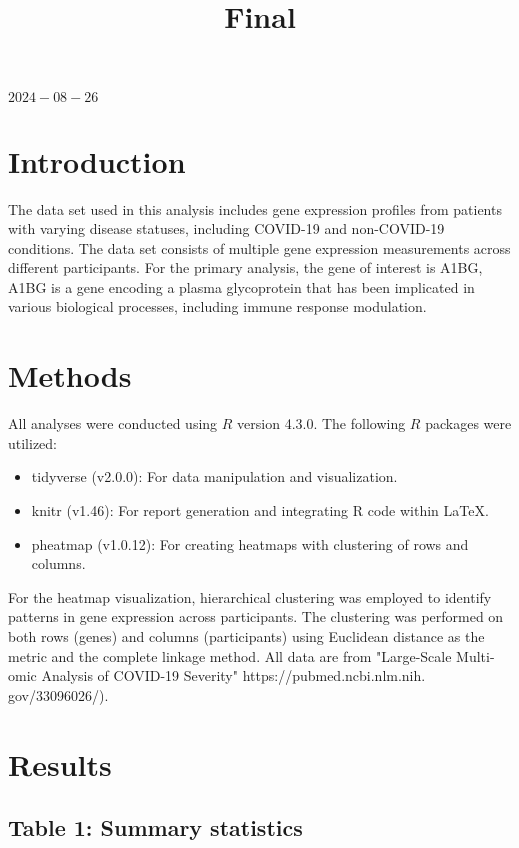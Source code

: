 \documentclass[10pt]{article}
\title{Final }
\author{}
\date{}
\begin{document}
\maketitle
$2024-08-26$

\section*{Introduction}
The data set used in this analysis includes gene expression profiles from patients with varying disease statuses, including COVID-19 and non-COVID-19 conditions. The data set consists of multiple gene expression measurements across different participants. For the primary analysis, the gene of interest is A1BG, A1BG is a gene encoding a plasma glycoprotein that has been implicated in various biological processes, including immune response modulation.

\section*{Methods}
All analyses were conducted using $R$ version 4.3.0. The following $R$ packages were utilized:

\begin{itemize}
  \item tidyverse (v2.0.0): For data manipulation and visualization.
  \item knitr (v1.46): For report generation and integrating R code within LaTeX.
  \item pheatmap (v1.0.12): For creating heatmaps with clustering of rows and columns.
\end{itemize}

\noindent For the heatmap visualization, hierarchical clustering was employed to identify patterns in gene expression across participants. The clustering was performed on both rows (genes) and columns (participants) using Euclidean distance as the metric and the complete linkage method. All data are from "Large-Scale Multi-omic Analysis of COVID-19 Severity" {https://pubmed.ncbi.nlm.nih.
gov/33096026/}).

\section*{Results}

\subsection*{Table 1: Summary statistics}
\end{document}
